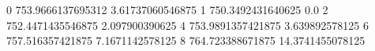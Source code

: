 0 753.9666137695312 3.61737060546875
1 750.3492431640625 0.0
2 752.4471435546875 2.097900390625
4 753.9891357421875 3.639892578125
6 757.516357421875 7.1671142578125
8 764.723388671875 14.3741455078125
